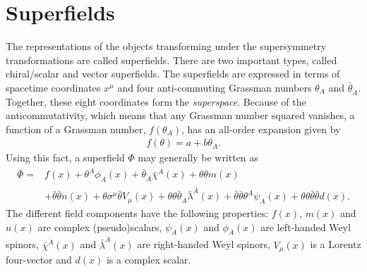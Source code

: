 \documentclass[twoside,english]{uiofysmaster}
\begin{document}
\section{Superfields}
The representations of the objects transforming under the supersymmetry transformations are called superfields. There are two important types, called chiral/scalar and vector superfields. The superfields are expressed in terms of spacetime coordinates $x^\mu$ and four anti-commuting Grassman numbers $\theta_A$ and $\bar\theta_{\dot A}$. Together, these eight coordinates form the {\it superspace}. Because of the anticommutativity, which means that any Grassman number squared vanishes, a function of a Grassman number, $f(\theta_A)$, has an all-order expansion given by
\begin{align}
	f(\theta) = a + b\theta_A.
\end{align}
Using this fact, a superfield $\Phi$ may generally be written as
\begin{align}
	\Phi = &f(x) + \theta^A\phi_A(x) + \bar\theta_{\dot A}\bar\chi^{\dot A}(x) + \theta \theta m(x)\\
	 &+ \bar\theta \bar\theta n(x) + \theta\sigma^\mu \bar\theta V_\mu(x) + \theta\theta\bar\theta_{\dot A}\bar\lambda^{\dot A}(x) + \bar\theta \bar\theta \theta^A \psi_A(x) + \theta \theta \bar\theta \bar\theta d(x).\nonumber
\end{align}
The different field components have the following properties: $f(x)$, $m(x)$ and $n(x)$ are complex (pseudo)scalars, $\psi_A(x)$ and $\phi_A(x)$ are left-handed Weyl spinors, $\bar\chi^{\dot A}(x)$ and $\bar\lambda^{\dot A}(x)$ are right-handed Weyl spinors, $V_\mu (x)$ is a Lorentz four-vector and $d(x)$ is a complex scalar.
\end{document}
